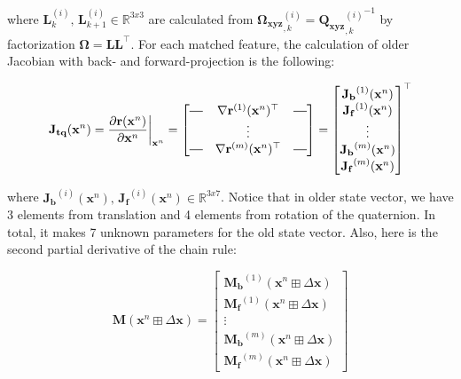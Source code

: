\documentclass[12pt]{report}
\numberwithin{figure}{section}
\newcommand{\R}{\mathbb{R}}
\newcommand*{\horzbar}{\rule[.5ex]{2.5ex}{0.5pt}}
\begin{document}
\begin{appendices}
where $\mathbf{L}^{(i)}_{k} \text{, } \mathbf{L}^{(i)}_{k+1} \in \R^{3x3}$ are 
calculated from 
$\mathbf{\Omega_{xyz}}^{(i)}_{,k}  =  {\mathbf{Q_{xyz}}^{(i)}_{,k}}^{-1}$ 
by factorization $\mathbf{\Omega = LL^\top}$.
For each matched feature, 
the calculation of older Jacobian with back- and forward-projection is the following:

\begin{equation}
  \mathbf{J_{tq}}(\mathbf{x}^n) = \frac{\partial 
  \mathbf{r}(\mathbf{x}^n)}{\partial \mathbf{x}^n } \bigg|_{\mathbf{x}^n}
  = 
  \begin{bmatrix}
    \horzbar & \nabla \mathbf{r}^{(1)}(\mathbf{x}^n)^\top & \horzbar \\
     & \vdots & \\
     \horzbar & \nabla \mathbf{r}^{(m)}(\mathbf{x}^n)^\top & \horzbar 
  \end{bmatrix}
  =
  \begin{bmatrix}
    \mathbf{J_b}^{(1)}(\mathbf{x}^n) \\
    \mathbf{J_f}^{(1)}(\mathbf{x}^n) \\
    \vdots \\
    \mathbf{J_b}^{(m)}(\mathbf{x}^n) \\
    \mathbf{J_f}^{(m)}(\mathbf{x}^n)
  \end{bmatrix}^\top
\end{equation}

where $\mathbf{J_b}^{(i)}(\mathbf{x}^n) \text{, } 
\mathbf{J_f}^{(i)}(\mathbf{x}^n) \in \R^{3x7}$. Notice that in older state 
vector, we have 3 elements from translation and 4 elements from rotation of the 
quaternion. In total, it makes 7 unknown parameters for the old state vector. 
Also, here is the second partial derivative of the chain rule:

\begin{equation}
  \mathbf{M} (\mathbf{x}^n\boxplus \Delta \mathbf{x})
  =
  \begin{bmatrix}
    \mathbf{M_b}^{(1)}(\mathbf{x}^n\boxplus \Delta \mathbf{x}) \\
    \mathbf{M_f}^{(1)}(\mathbf{x}^n\boxplus \Delta \mathbf{x}) \\
    \vdots \\
    \mathbf{M_b}^{(m)}(\mathbf{x}^n\boxplus \Delta \mathbf{x}) \\
    \mathbf{M_f}^{(m)}(\mathbf{x}^n\boxplus \Delta \mathbf{x})
  \end{bmatrix}
\end{equation}


\end{appendices}
\end{document}

